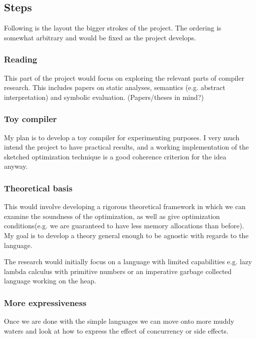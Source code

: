 \documentclass[a4paper]{article}
\begin{document}
\subsection{Steps}

Following is the layout the bigger strokes of the project. The ordering is somewhat arbitrary and would be fixed as the project develops.

\subsubsection*{Reading}

This part of the project would focus on exploring the relevant parts of compiler research. This includes papers on static analyses, semantics (e.g. abstract interpretation) and symbolic evaluation. (Papers/theses in mind?)

\subsubsection*{Toy compiler}

My plan is to develop a toy compiler for experimenting purposes. I very much intend the project to have practical results, and a working implementation of the sketched optimization technique is a good coherence criterion for the idea anyway.

\subsubsection*{Theoretical basis}

This would involve developing a rigorous theoretical framework in which we can examine the soundness of the optimization, as well as give optimization conditions(e.g. we are guaranteed to have less memory allocations than before). My goal is to develop a theory general enough to be agnostic with regards to the language.

The research would initially focus on a language with limited capabilities e.g. lazy lambda calculus with primitive numbers or an imperative garbage collected language working on the heap.

\subsubsection*{More expressiveness}

Once we are done with the simple languages we can move onto more muddy waters and look at how to express the effect of concurrency or side effects.
\end{document}
